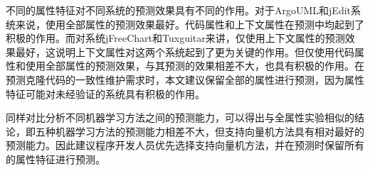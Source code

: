 不同的属性特征对不同系统的预测效果具有不同的作用。对于ArgoUML和jEdit系统来说，使用全部属性的预测效果最好。代码属性和上下文属性在预测中均起到了积极的作用。而对系统jFreeChart和Tuxguitar来讲，仅使用上下文属性的预测效果最好，这说明上下文属性对这两个系统起到了更为关键的作用。但仅使用代码属性和使用全部属性的预测效果，与其预测的效果相差不大，也具有积极的作用。在预测克隆代码的一致性维护需求时，本文建议保留全部的属性进行预测，因为属性特征可能对未经验证的系统具有积极的作用。

同样对比分析不同机器学习方法之间的预测能力，可以得出与全属性实验相似的结论，即五种机器学习方法的预测能力相差不大，但支持向量机方法具有相对最好的预测能力。因此建议程序开发人员优先选择支持向量机方法，并在预测时保留所有的属性特征进行预测。



